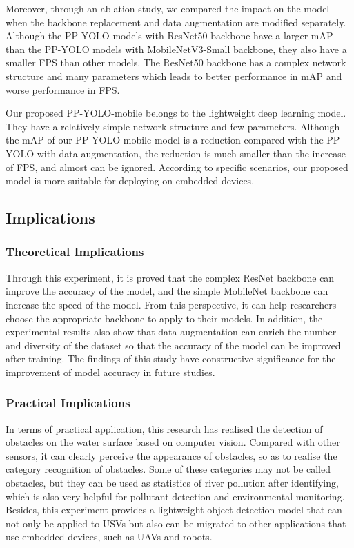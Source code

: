 \documentclass[sensors,article,submit,moreauthors,pdftex]{Definitions/mdpi}
\begin{document}
\begin{paracol}{2}
Moreover, through an ablation study, we compared the impact on the model when the backbone replacement and data augmentation are modified separately.
Although the PP-YOLO models with ResNet50 backbone have a larger mAP than the PP-YOLO models with MobileNetV3-Small backbone, they also have a smaller FPS than other models. The ResNet50 backbone has a complex network structure and many parameters which leads to better performance in mAP and worse performance in FPS.


Our proposed PP-YOLO-mobile belongs to the lightweight deep learning model. They have a relatively simple network structure and few parameters. Although the mAP of our PP-YOLO-mobile model is a reduction compared with the PP-YOLO with data augmentation, the reduction is much smaller than the increase of FPS, and almost can be ignored. According to specific scenarios, our proposed model is more suitable for deploying on embedded devices.


\subsection{Implications}
\subsubsection{Theoretical Implications}
Through this experiment, it is proved that the complex ResNet backbone can improve the accuracy of the model, and the simple MobileNet backbone can increase the speed of the model. From this perspective, it can help researchers choose the appropriate backbone to apply to their models. In addition, the experimental results also show that data augmentation can enrich the number and diversity of the dataset so that the accuracy of the model can be improved after training. The findings of this study have constructive significance for the improvement of model accuracy in future studies.

\subsubsection{Practical Implications}
In terms of practical application, this research has realised the detection of obstacles on the water surface based on computer vision. Compared with other sensors, it can clearly perceive the appearance of obstacles, so as to realise the category recognition of obstacles.
Some of these categories may not be called obstacles, but they can be used as statistics of river pollution after identifying, which is also very helpful for pollutant detection and environmental monitoring. 
Besides, this experiment provides a lightweight object detection model that can not only be applied to USVs but also can be migrated to other applications that use embedded devices, such as UAVs and robots.



\end{paracol}
\end{document}

